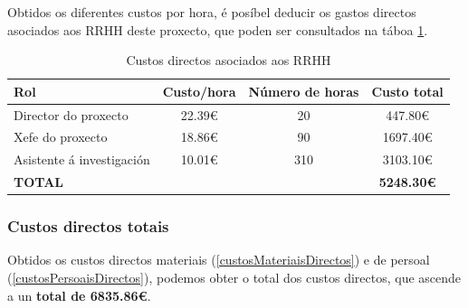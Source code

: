 \begin{table}[H]
\centering
\caption{Cálculo dos salarios dos diferentes roles do proxecto}
\label{calculoSalarios}
\end{table}

Obtidos os diferentes custos por hora, é posíbel deducir os gastos directos asociados aos \gls{RRHH} deste proxecto, que poden ser consultados na táboa \ref{custosDirectosRRHH}.

\begin{table}[H]
\centering
\caption{Custos directos asociados aos \gls{RRHH}}
\label{custosDirectosRRHH}
\begin{tabular}{|l|c|c|c|}
\hline
\textbf{Rol} & \textbf{Custo/hora }& \textbf{Número de horas} & \textbf{Custo total} \\ \hline
Director do proxecto & 22.39\euro & 20 & 447.80\euro \\ \hline
Xefe do proxecto & 18.86\euro & 90 & 1697.40\euro \\ \hline
Asistente á investigación & 10.01\euro & 310 & 3103.10\euro \\ \hline \hline
\textbf{TOTAL} & \multicolumn{2}{l|}{} & \textbf{5248.30\euro} \\ \hline
\end{tabular}
\end{table}

\subsubsection{Custos directos totais}

Obtidos os custos directos materiais (\ref{custosMateriaisDirectos}) e de persoal (\ref{custosPersoaisDirectos}), podemos obter o total dos custos directos, que ascende a un \textbf{total de 6835.86\euro}.

